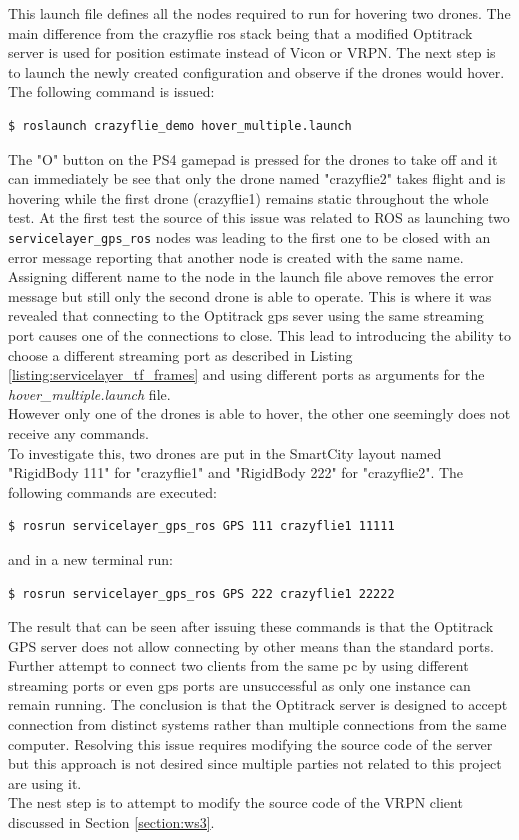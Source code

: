 \noindent This launch file defines all the nodes required to run for hovering two drones. The main difference from the crazyflie ros stack being that a modified Optitrack server is used for position estimate instead of Vicon or VRPN. The next step is to launch the newly created configuration and observe if the drones would hover.\\
\noindent The following command is issued:
\begin{verbatim}
$ roslaunch crazyflie_demo hover_multiple.launch
\end{verbatim}
The "O" button on the PS4 gamepad is pressed for the drones to take off and it can immediately be see that only the drone named "crazyflie2" takes flight and is hovering while the first drone (crazyflie1) remains static throughout the whole test. At the first test the source of this issue was related to ROS as launching two \texttt{servicelayer\_gps\_ros} nodes was leading to the first one to be closed with an error message reporting that another node is created with the same name.\\
\noindent Assigning different name to the node in the launch file above removes the error message but still only the second drone is able to operate. This is where it was revealed that connecting to the Optitrack gps sever using the same streaming port causes one of the connections to close. This lead to introducing the ability to choose a different streaming port as described in Listing \ref{listing:servicelayer_tf_frames} and using different ports as arguments for the \textit{hover\_multiple.launch} file.\\
However only one of the drones is able to hover, the other one seemingly does not receive any commands.\\
To investigate this, two drones are put in the SmartCity layout named "RigidBody 111" for "crazyflie1" and "RigidBody 222" for "crazyflie2". The following commands are executed:
\begin{verbatim}
$ rosrun servicelayer_gps_ros GPS 111 crazyflie1 11111
\end{verbatim}

\noindent and in a new terminal run:

\begin{verbatim}
$ rosrun servicelayer_gps_ros GPS 222 crazyflie1 22222
\end{verbatim}

\noindent The result that can be seen after issuing these commands is that the Optitrack GPS server does not allow connecting by other means than the standard ports. Further attempt to connect two clients from the same pc by using different streaming ports or even gps ports are unsuccessful as only one instance can remain running. The conclusion is that the Optitrack server is designed to accept connection from distinct systems rather than multiple connections from the same computer. Resolving this issue requires modifying the source code of the server but this approach is not desired since multiple parties not related to this project are using it.\\
The nest step is to attempt to modify the source code of the VRPN client discussed in Section \ref{section:ws3}.

